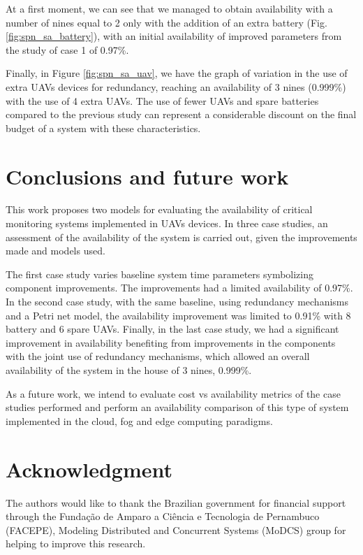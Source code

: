 \documentclass[conference]{IEEEtran}
\begin{document}
At a first moment, we can see that we managed to obtain availability with a number of nines equal to 2 only with the addition of an extra battery (Fig.\ref{fig:spn_sa_battery}), with an initial availability of improved parameters from the study of case 1 of 0.97\%.

Finally, in Figure \ref{fig:spn_sa_uav}, we have the graph of variation in the use of extra UAVs devices for redundancy, reaching an availability of 3 nines (0.999\%) with the use of 4 extra UAVs. The use of fewer UAVs and spare batteries compared to the previous study can represent a considerable discount on the final budget of a system with these characteristics.


\section{Conclusions and future work}\label{sec:conclusions}

This work proposes two models for evaluating the availability of critical monitoring systems implemented in UAVs devices. In three case studies, an assessment of the availability of the system is carried out, given the improvements made and models used. 

The first case study varies baseline system time parameters symbolizing component improvements. The improvements had a limited availability of 0.97\%. In the second case study, with the same baseline, using redundancy mechanisms and a Petri net model, the availability improvement was limited to 0.91\% with 8 battery and 6 spare UAVs. Finally, in the last case study, we had a significant improvement in availability benefiting from improvements in the components with the joint use of redundancy mechanisms, which allowed an overall availability of the system in the house of 3 nines, 0.999\%.

As a future work, we intend to evaluate cost vs availability metrics of the case studies performed and perform an availability comparison of this type of system implemented in the cloud, fog and edge computing paradigms.


\section*{Acknowledgment}\label{sec:acknowledgment}
The authors would like to thank the Brazilian government for financial support through the Fundação de Amparo a Ciência e Tecnologia de Pernambuco (FACEPE), Modeling Distributed and Concurrent Systems (MoDCS) group for helping to improve this research.




\end{document}
